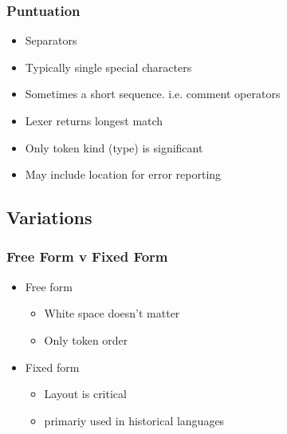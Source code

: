\documentclass[usepdftitle=false,professionalfonts,compress ]{beamer}
\begin{document}
{
\begin{frame}\frametitle{Puntuation}

	\begin{itemize}
	\item Separators
			\item Typically single special characters
			\item Sometimes a short sequence.  i.e. comment operators
			\item Lexer returns longest match
			\item Only token kind (type) is significant
			\item May include location for error reporting
				\end{itemize}

\end{frame}}








\subsection{Variations}

{
\begin{frame}\frametitle{Free Form v Fixed Form}

	\begin{itemize}
	\item Free form

	\begin{itemize}
	\item White space doesn't matter
			\item Only token order
				\end{itemize}

			\item Fixed form

	\begin{itemize}
	\item Layout is critical
			\item primariy used in historical languages
				\end{itemize}

				\end{itemize}

\end{frame}}
\end{document}
